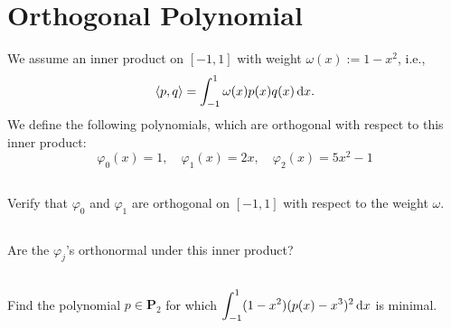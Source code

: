 \documentclass[11pt,letterpaper]{article}
\begin{document}
\section{Orthogonal Polynomial}
We assume
  an inner product on $[-1,1]$ with weight $\omega(x):=1-x^2$, i.e.,
  $$
  \langle p,q\rangle = \int_{-1}^1 \omega(x)p(x)q(x)\,\mathrm{d} x.
  $$ We define the following polynomials, which are orthogonal with
  respect to this inner product:
  $$
  \varphi_0(x) = 1, \quad \varphi_1(x) = 2x, \quad \varphi_2(x) = 5x^2-1
  $$

\subsection{}
Verify that $\varphi_0$ and $\varphi_1$ are orthogonal on $[-1,1]$
    with respect to the weight $\omega$.

\subsection{}
Are the $\varphi_j$'s orthonormal under this inner product?

\subsection{}
Find the polynomial $p \in \boldsymbol P_2$ for which
    $\displaystyle \int_{-1}^1 (1-x^2)(p(x) - x^3)^2 \, \mathrm{d} x$ is minimal.




% 
% 
\end{document}
